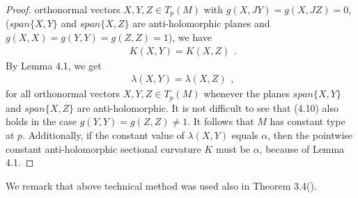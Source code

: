\documentclass{amsart}
\newtheorem*{theorem A}{Theorem A}
\newtheorem*{theorem B}{N\"olker's Theorem}
\theoremstyle{remark}
\theoremstyle{remark}
\theoremstyle{definition}
\numberwithin{equation}{section}
\begin{document}
\begin{proof}
orthonormal vectors $X,Y,Z\in T_{p}(M)$ with $g(X,JY)=g(X,JZ)=0,$
($span\{X,Y\}$ and $span\{X,Z\}$ are anti-holomorphic planes and
$g(X,X)=g(Y,Y)=g(Z,Z)=1$), we have
\begin{equation}
\label{e1}
\begin{array}{c}
K(X,Y)=K(X,Z)
\end{array}.
\end{equation}
By Lemma 4.1, we get
\begin{equation}
\label{e1}
\begin{array}{c}
\lambda(X,Y)=\lambda(X,Z)
\end{array},
\end{equation}
for all orthonormal vectors $X,Y,Z\in T_{p}(M)$  whenever the planes
$span\{X,Y\}$ and $span\{X,Z\}$ are anti-holomorphic. It is not
difficult to see that (4.10) also holds in the case
$g(Y,Y)=g(Z,Z)\neq1.$ It follows that $M$ has constant type at $p.$
Additionally, if the constant value of $\lambda(X,Y)$ equals
$\alpha$, then the pointwise constant anti-holomorphic sectional
curvature $K$ must be $\alpha$, because of Lemma 4.1.
\end{proof}
We remark that above technical method was used also in Theorem 3.4(\cite{Tas}).\\
\end{document}
